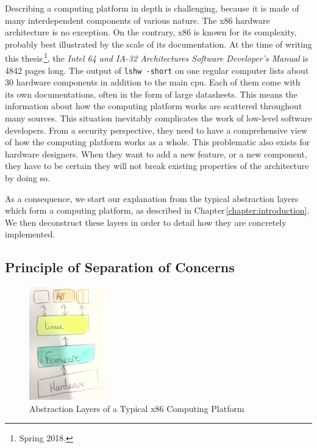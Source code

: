 
Describing a computing platform in depth is challenging, because it is made of
many interdependent components of various nature.
%
The x86 hardware architecture is no exception.
%
On the contrary, x86 is known for its complexity, probably best illustrated by
the scale of its documentation.
%
At the time of writing this thesis\,\footnote{Spring 2018.}, the \emph{Intel 64
  and IA-32 Architectures Software Developer’s Manual} is 4842 pages long.
%
The output of \texttt{lshw -short} on one regular computer lists about 30
hardware components in addition to the main \ac{cpu}.
%
Each of them come with its own documentations, often in the form of large
datasheets.
%
This means the information about how the computing platform works are scattered
throughout many sources.
%
This situation inevitably complicates the work of low-level software developers.
%
From a security perspective, they need to have a comprehensive view of how the
computing platform works as a whole.
%
This problematic also exists for hardware designers.
%
When they want to add a new feature, or a new component, they have to be certain
they will not break existing properties of the architecture by doing so.

%
As a consequence, we start our explanation from the typical abstraction layers
which form a computing platform, as described in
Chapter\,\ref{chapter:introduction}.
%
We then deconstruct these layers in order to detail how they are concretely
implemented.

\subsection{Principle of Separation of Concerns}

\begin{figure}
  \centering
  \includegraphics[width=0.3\textwidth]{Figures/computing-platform-1.jpg}
  \caption{Abstraction Layers of a Typical x86 Computing Platform}
  \label{fig:usecase:computing-platform-1}
\end{figure}

